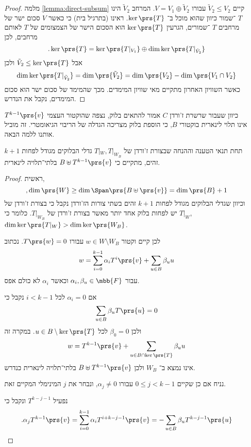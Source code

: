 \documentclass[a4paper,10pt,twoside,openany]{article}
\begin{document}
\begin{proof}
מלמה
\ref{lemma:direct-subsum}
קיים
$\tilde{V}_2 \leq V_2$
עבורו
$V = V_1 \oplus \tilde{V}_2$.
המרחב
$\tilde{V}_2$
הינו
$T$%
־שמור כיוון שהוא מוכל ב־%
$\ker\prs{T}$.
ראינו (בתרגיל בית) כי כאשר
$V$
סכום ישר של מרחבים
$T$%
־שמורים, הגרעין
$\ker\prs{T}$
הוא הסכום הישר של הצמצומים של
$T$
לאותם מרחבים, לכן
\[\text{.} \ker\prs{T} = \ker\prs{T|_{V_1}} \oplus \dim\ker\prs{T|_{\tilde{V}_2}}\]
אבל
$\tilde{V}_2 \leq \ker\prs{T}$
ולכן
\[\dim\ker\prs{T|_{\tilde{V}_2}} = \dim\prs{\tilde{V}_2} = \dim\prs{V_2} - \dim\prs{V_1 \cap V_2}\]
כאשר השוויון האחרון מתקיים מאי שוויון המימדים.
מכך שהמימד של סכום ישר הוא סכום המימדים, נקבל את הנדרש.
\end{proof}

כיוון שעבור שרשרת ז'ורדן
$C$
אמור להתאים בלוק, נצפה שהוקטור העצמי
$T^{k-1}\prs{v}$
אינו תלוי לינארית בוקטורי
$B$,
כי הוספת בלוק מצריכה הגדלה של הריבוי הגיאומטרי. זה מוביל אותנו ללמה הבאה.

\begin{lemma}\label{lemma:extra-eigenvector}
תחת תנאי הטענה וההנחה שבצורת ז'ורדן של
$T|_{W}, T|_{W_B}$
גדלי הבלוקים מגודל לפחות
$k+1$
זהים,
מתקיים כי
$B \uplus T^{k-1}\prs{v}$
בלתי־תלויה לינארית.
\end{lemma}

\begin{proof}
ראשית,
\[\text{,} \dim\prs{W} \geq \dim \Span\prs{B \uplus \prs{v}} = \dim\prs{B} + 1\]
וכיוון שגדלי הבלוקים מגודל לפחות
$k+1$
זהים בשתי צורות הז'ורדן נקבל כי בצורת ז'ורדן של
$T|_W$
יש לפחות בלוק אחד יותר מאשר בצורת ז'ורדן של
$T|_{W_B}$.
כלומר כי,
$\dim\ker\prs{T|_W} > \dim\ker\prs{W_B}$.

לכן קיים וקטור
$w \in W \setminus W_B$
עבורו
$T\prs{w} = 0$.
נכתוב
\[w = \sum_{i=0}^{k-1} \alpha_i T^i\prs{v} + \sum_{u \in B} \beta_u u\]
עבור
$\alpha_i, \beta_u \in \mbb{F}$
וכאשר
$\alpha_i$
לא כולם אפס.

אם
$\alpha_i = 0$
לכל
$i < k-1$
נקבל כי
\[\sum_{u \in B} \beta_u T\prs{u} = 0\]
ולכן
$\beta_0 = 0$
לכל
$u \in B \setminus \ker\prs{T}$.
במקרה זה
\[w = T^{k-1}\prs{v} + \sum_{u \in B \cap \ker\prs{T}} \beta_u u\]
אינו נמצא ב־%
$W_B$
ולכן
$B \uplus T^{k-1}\prs{v}$
בלתי־תלויה לינארית כנדרש.

נניח אם כן שקיים
$0 \leq j < k-1$
עבורו
$\alpha_j \neq 0$,
ונבחר את
$j$
המינימלי המקיים זאת.

נפעיל
$T^{k-j-1}$
ונקבל כי
\[\text{.} \alpha_j T^{k-1}\prs{v} = \sum_{i=0}^{k-1} \alpha_i T^{i+k-j-1}\prs{v} = -\sum_{u \in B} \beta_u T^{k-j-1}\prs{u}\]
\end{proof}
\end{document}
